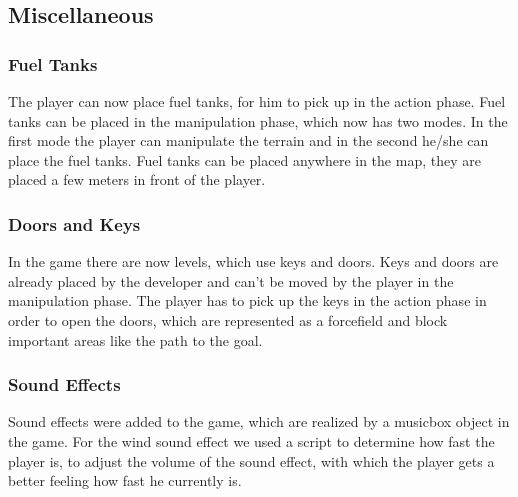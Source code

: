 \documentclass[12pt, letterpaper]{scrartcl}
\begin{document}
	 \subsection{Miscellaneous}
	 \subsubsection{Fuel Tanks}
	 The player can now place fuel tanks, for him to pick up in the action phase. Fuel tanks can be placed in the manipulation phase, which now has two modes. In the first mode the player can manipulate the terrain and in the second he/she can place the fuel tanks. Fuel tanks can be placed anywhere in the map, they are placed a few meters in front of the player.
	 
	 \subsubsection{Doors and Keys}
	 In the game there are now levels, which use keys and doors. Keys and doors are already placed by the developer and can't be moved by the player in the manipulation phase. The player has to pick up the keys in the action phase in order to open the doors, which are represented as a forcefield and block important areas like the path to the goal.
	 
	 \subsubsection{Sound Effects}
	 Sound effects were added to the game, which are realized by a musicbox object in the game. For the wind sound effect we used a script to determine how fast the player is, to adjust the volume of the sound effect, with which the player gets a better feeling how fast he currently is. 
	 
\end{document}
